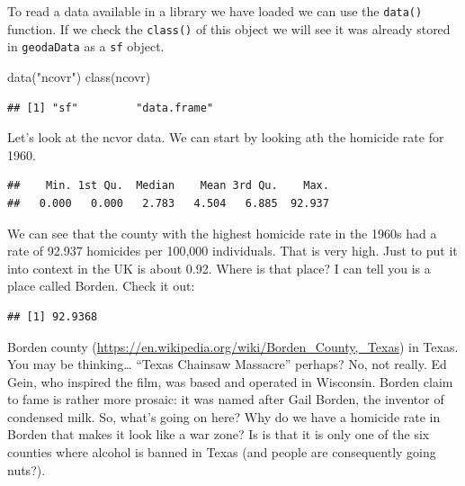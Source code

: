\documentclass[
]{book}
\makeatletter
\newenvironment{Shaded}{\begin{snugshade}}{\end{snugshade}}
\newcommand{\FunctionTok}[1]{\textcolor[rgb]{0,0,0}{#1}}
\newcommand{\NormalTok}[1]{#1}
\newcommand{\OtherTok}[1]{\textcolor[rgb]{0.37,0.37,0.37}{#1}}
\newcommand{\SpecialCharTok}[1]{\textcolor[rgb]{0,0,0}{#1}}
\newcommand{\StringTok}[1]{\textcolor[rgb]{0.5,0.5,0.5}{#1}}
\newenvironment{kframe}{%
\medskip{}
\setlength{\fboxsep}{.8em}
 \def\at@end@of@kframe{}%
 \ifinner\ifhmode%
  \def\at@end@of@kframe{\end{minipage}}%
  \begin{minipage}{\columnwidth}%
 \fi\fi%
 \def\FrameCommand##1{\hskip\@totalleftmargin \hskip-\fboxsep
 \colorbox{shadecolor}{##1}\hskip-\fboxsep
     \hskip-\linewidth \hskip-\@totalleftmargin \hskip\columnwidth}%
 \MakeFramed {\advance\hsize-\width
   \@totalleftmargin\z@ \linewidth\hsize
   \@setminipage}}%
 {\par\unskip\endMakeFramed%
 \at@end@of@kframe}
\renewenvironment{Shaded}{\begin{kframe}}{\end{kframe}}
\makeatother
\begin{document}
To read a data available in a library we have loaded we can use the \texttt{data()} function. If we check the \texttt{class()} of this object we will see it was already stored in \texttt{geodaData} as a \texttt{sf} object.

\begin{Shaded}
\begin{Highlighting}[]
\FunctionTok{data}\NormalTok{(}\StringTok{"ncovr"}\NormalTok{)}
\FunctionTok{class}\NormalTok{(ncovr)}
\end{Highlighting}
\end{Shaded}

\begin{verbatim}
## [1] "sf"         "data.frame"
\end{verbatim}

Let's look at the ncvor data. We can start by looking ath the homicide rate for 1960.

\begin{Shaded}
\end{Shaded}

\begin{verbatim}
##    Min. 1st Qu.  Median    Mean 3rd Qu.    Max. 
##   0.000   0.000   2.783   4.504   6.885  92.937
\end{verbatim}

We can see that the county with the highest homicide rate in the 1960s had a rate of 92.937 homicides per 100,000 individuals. That is very high. Just to put it into context in the UK is about 0.92. Where is that place? I can tell you is a place called Borden. Check it out:

\begin{Shaded}
\end{Shaded}

\begin{verbatim}
## [1] 92.9368
\end{verbatim}

Borden county (\url{https://en.wikipedia.org/wiki/Borden_County,_Texas}) in Texas. You may be thinking\ldots{} ``Texas Chainsaw Massacre'' perhaps? No, not really. Ed Gein, who inspired the film, was based and operated in Wisconsin. Borden claim to fame is rather more prosaic: it was named after Gail Borden, the inventor of condensed milk. So, what's going on here? Why do we have a homicide rate in Borden that makes it look like a war zone? Is is that it is only one of the six counties where alcohol is banned in Texas (and people are consequently going nuts?).
\end{document}
